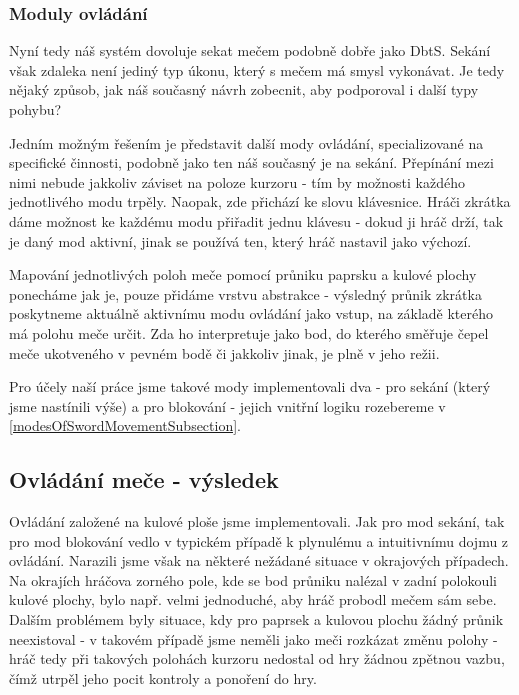 \subsubsection*{Moduly ovládání}

Nyní tedy náš systém dovoluje sekat mečem podobně dobře jako \acl{DbtS}. Sekání však zdaleka není jediný typ úkonu, který s mečem má smysl vykonávat. Je tedy nějaký způsob, jak náš současný návrh zobecnit, aby podporoval i další typy pohybu?

Jedním možným řešením je představit další mody ovládání, specializované na specifické činnosti, podobně jako ten náš současný je na sekání. Přepínání mezi nimi nebude jakkoliv záviset na poloze kurzoru - tím by možnosti každého jednotlivého modu trpěly. Naopak, zde přichází ke slovu klávesnice. Hráči zkrátka dáme možnost ke každému modu přiřadit jednu klávesu - dokud ji hráč drží, tak je daný mod aktivní, jinak se používá ten, který hráč nastavil jako výchozí.

Mapování jednotlivých poloh meče pomocí průniku paprsku a kulové plochy ponecháme jak je, pouze přidáme vrstvu abstrakce - výsledný průnik zkrátka poskytneme aktuálně aktivnímu modu ovládání jako vstup, na základě kterého má polohu meče určit. Zda ho interpretuje jako bod, do kterého směřuje čepel meče ukotveného v pevném bodě či jakkoliv jinak, je plně v jeho režii.

Pro účely naší práce jsme takové mody implementovali dva - pro sekání (který jsme nastínili výše) a pro blokování - jejich vnitřní logiku rozebereme v \ref{modesOfSwordMovementSubsection}.


\subsection{Ovládání meče - výsledek}

Ovládání založené na kulové ploše jsme implementovali. Jak pro mod sekání, tak pro mod blokování vedlo v typickém případě k plynulému a intuitivnímu dojmu z ovládání. Narazili jsme však na některé nežádané situace v okrajových případech. Na okrajích hráčova zorného pole, kde se bod průniku nalézal v zadní polokouli kulové plochy, bylo např. velmi jednoduché, aby hráč probodl mečem sám sebe. Dalším problémem byly situace, kdy pro paprsek a kulovou plochu žádný průnik neexistoval - v takovém případě jsme neměli jako meči rozkázat změnu polohy - hráč tedy při takových polohách kurzoru nedostal od hry žádnou zpětnou vazbu, čímž utrpěl jeho pocit kontroly a ponoření do hry.

